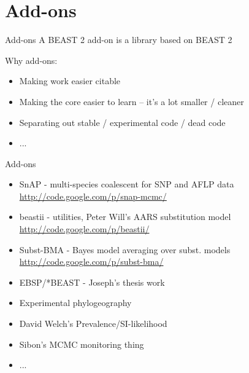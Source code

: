 \documentclass{beamer}
\theoremstyle{definition}
\begin{document}
\section{Add-ons}
\begin{frame}{Add-ons}
A BEAST 2 add-on is a library based on BEAST 2\vskip1cm

Why add-ons:
\begin{itemize}
\item Making work easier citable
\item Making the core easier to learn -- it's a lot smaller / cleaner
\item Separating out stable / experimental code / dead code
\item ...
\end{itemize}

\end{frame}

\begin{frame}{Add-ons}

\begin{itemize}
\item SnAP - multi-species coalescent for SNP and AFLP data
\url{http://code.google.com/p/snap-mcmc/}
\item beastii - utilities, Peter Will's AARS substitution model
\url{http://code.google.com/p/beastii/}
\item Subst-BMA - Bayes model averaging over subst. models
\url{http://code.google.com/p/subst-bma/}
\item EBSP/*BEAST - Joseph's thesis work
\item Experimental phylogeography
\item David Welch's Prevalence/SI-likelihood
\item Sibon's MCMC monitoring thing
\item ...
\end{itemize}
\end{frame}
\end{document}
